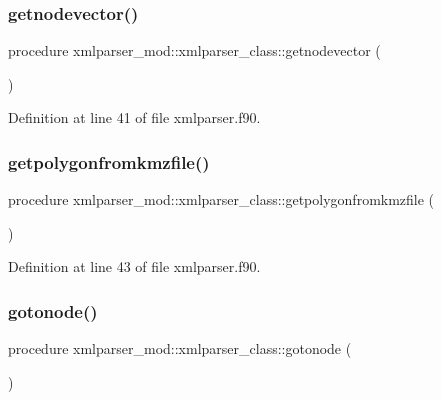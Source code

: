 \subsubsection{\texorpdfstring{getnodevector()}{getnodevector()}}
{\footnotesize\ttfamily procedure xmlparser\+\_\+mod\+::xmlparser\+\_\+class\+::getnodevector (\begin{DoxyParamCaption}{ }\end{DoxyParamCaption})\hspace{0.3cm}{\ttfamily [private]}}



Definition at line 41 of file xmlparser.\+f90.

\mbox{\label{structxmlparser__mod_1_1xmlparser__class_a9682aa628f2166f690e997cc791d8ea6}} 
\subsubsection{\texorpdfstring{getpolygonfromkmzfile()}{getpolygonfromkmzfile()}}
{\footnotesize\ttfamily procedure xmlparser\+\_\+mod\+::xmlparser\+\_\+class\+::getpolygonfromkmzfile (\begin{DoxyParamCaption}{ }\end{DoxyParamCaption})\hspace{0.3cm}{\ttfamily [private]}}



Definition at line 43 of file xmlparser.\+f90.

\mbox{\label{structxmlparser__mod_1_1xmlparser__class_ab8393d12a17d3409c136cdf29d0463b2}} 
\subsubsection{\texorpdfstring{gotonode()}{gotonode()}}
{\footnotesize\ttfamily procedure xmlparser\+\_\+mod\+::xmlparser\+\_\+class\+::gotonode (\begin{DoxyParamCaption}{ }\end{DoxyParamCaption})\hspace{0.3cm}{\ttfamily [private]}}



